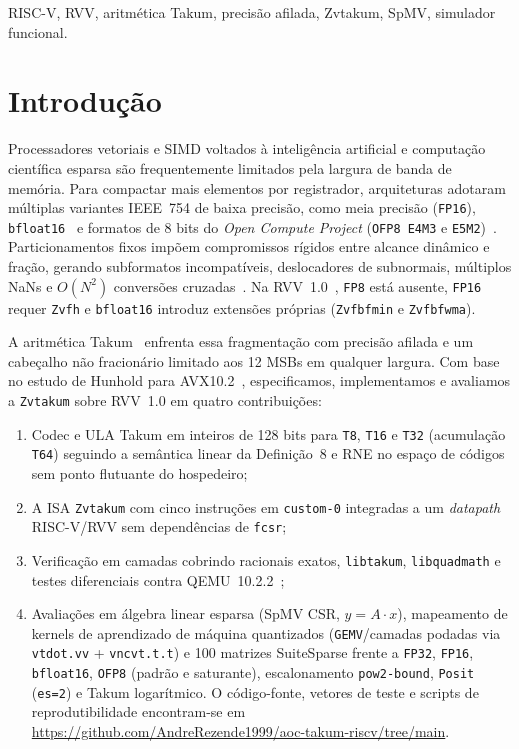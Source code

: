 \documentclass[conference]{IEEEtran}
\begin{document}
\begin{IEEEkeywords}
RISC-V, RVV, aritm\'etica Takum, precis\~ao afilada, Zvtakum, SpMV, simulador funcional.
\end{IEEEkeywords}

\section{Introdu\c{c}\~ao}
Processadores vetoriais e SIMD voltados \`a intelig\^encia artificial e computa\c{c}\~ao cient\'ifica esparsa s\~ao frequentemente limitados pela largura de banda de mem\'oria. Para compactar mais elementos por registrador, arquiteturas adotaram m\'ultiplas variantes IEEE~754 de baixa precis\~ao, como meia precis\~ao (\texttt{FP16}), \texttt{bfloat16}~\cite{bfloat16} e formatos de 8 bits do \emph{Open Compute Project} (\texttt{OFP8 E4M3} e \texttt{E5M2})~\cite{ofp8,micikevicius2022fp8}. Particionamentos fixos imp\~oem compromissos r\'igidos entre alcance din\^amico e fra\c{c}\~ao, gerando subformatos incompat\'iveis, deslocadores de subnormais, m\'ultiplos NaNs e $O(N^2)$ convers\~oes cruzadas~\cite{hunhold2025avx102}. Na RVV~1.0~\cite{riscv-v-spec}, \texttt{FP8} est\'a ausente, \texttt{FP16} requer \texttt{Zvfh} e \texttt{bfloat16} introduz extens\~oes pr\'oprias (\texttt{Zvfbfmin} e \texttt{Zvfbfwma}).

A aritm\'etica Takum~\cite{hunhold2024takum} enfrenta essa fragmenta\c{c}\~ao com precis\~ao afilada e um cabe\c{c}alho n\~ao fracion\'ario limitado aos 12 MSBs em qualquer largura. Com base no estudo de Hunhold para AVX10.2~\cite{hunhold2025avx102}, especificamos, implementamos e avaliamos a \texttt{Zvtakum} sobre RVV~1.0 em quatro contribui\c{c}\~oes:
\begin{enumerate}
    \item Codec e ULA Takum em inteiros de 128 bits para \texttt{T8}, \texttt{T16} e \texttt{T32} (acumula\c{c}\~ao \texttt{T64}) seguindo a sem\^antica linear da Defini\c{c}\~ao~8 e RNE no espa\c{c}o de c\'odigos sem ponto flutuante do hospedeiro;
    \item A ISA \texttt{Zvtakum} com cinco instru\c{c}\~oes em \texttt{custom-0} integradas a um \emph{datapath} RISC-V/RVV sem depend\^encias de \texttt{fcsr};
    \item Verifica\c{c}\~ao em camadas cobrindo racionais exatos, \texttt{libtakum}, \texttt{libquadmath} e testes diferenciais contra QEMU~10.2.2~\cite{qemu};
    \item Avalia\c{c}\~oes em \'algebra linear esparsa (SpMV CSR, $y = A\cdot x$), mapeamento de kernels de aprendizado de m\'aquina quantizados (\texttt{GEMV}/camadas podadas via \texttt{vtdot.vv} + \texttt{vncvt.t.t}) e 100 matrizes SuiteSparse frente a \texttt{FP32}, \texttt{FP16}, \texttt{bfloat16}, \texttt{OFP8} (padr\~ao e saturante), escalonamento \texttt{pow2-bound}, \texttt{Posit} (\texttt{es=2}) e Takum logar\'itmico. O c\'odigo-fonte, vetores de teste e scripts de reprodutibilidade encontram-se em \url{https://github.com/AndreRezende1999/aoc-takum-riscv/tree/main}.
\end{enumerate}
\end{document}
